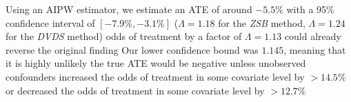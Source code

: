 Using an AIPW estimator, we estimate an ATE of around $-5.5\%$ with a 95\% confidence interval of $[-7.9\%, -3.1\%]$
($\Lambda = 1.18$ for the \textit{ZSB} method, $\Lambda = 1.24$ for the \textit{DVDS} method)
odds of treatment by a factor of $\Lambda = 1.13$ could already reverse the original finding
Our lower confidence bound was $1.145$, meaning that it is highly unlikely the true ATE would be negative unless unobserved confounders increased the odds of treatment in some covariate level by $> 14.5\%$ or decreased the odds of treatment in some covariate level by $> 12.7\%$
